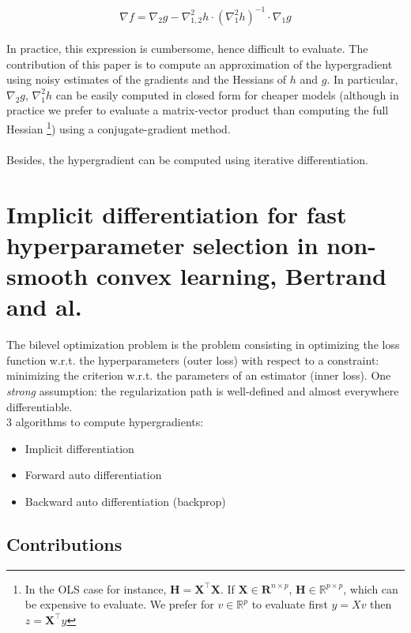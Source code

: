 \documentclass[a4paper,10pt]{article}
\theoremstyle{definition}
\begin{document}
\begin{equation*}
    \nabla f = \nabla_2 g - \nabla^2_{1,2}h \cdot (\nabla_1^2 h)^{-1} \cdot \nabla_1 g
\end{equation*}
\\
In practice, this expression is cumbersome, hence difficult to evaluate. The contribution of this paper is to compute an approximation of the hypergradient using noisy estimates
of the gradients and the Hessians of $h$ and $g$. In particular, $\nabla_2 g$, $\nabla^2_1 h$ can be
easily computed in closed form for cheaper models (although in practice we prefer to evaluate
a matrix-vector product than computing the full Hessian \footnote{In the OLS case for instance, $\mathbf{H} = \mathbf{X^\top X}$. If $\mathbf{X} \in \mathbf{R}^{n \times p}$,
$\mathbf{H} \in \mathbb{R}^{p \times p}$, which can be expensive to evaluate. We prefer for $v \in \mathbb{R}^{p}$ to evaluate
first $y=Xv$ then $z=\mathbf{X^\top}y$}) using a conjugate-gradient method.
\\
\\
Besides, the hypergradient can be computed using iterative differentiation.

\section{Implicit differentiation for fast hyperparameter selection in non-smooth convex learning, Bertrand and al.}

The bilevel optimization problem is the problem consisting in optimizing the loss function w.r.t. the hyperparameters (outer loss)
with respect to a constraint: minimizing the criterion w.r.t. the parameters  of an estimator (inner loss).
One \textit{strong} assumption: the regularization path is well-defined and almost everywhere differentiable.\\

3 algorithms to compute hypergradients:
\begin{itemize}
    \item Implicit differentiation
    \item Forward auto differentiation
    \item Backward auto differentiation (backprop)
\end{itemize}

\subsection*{Contributions}
\end{document}
